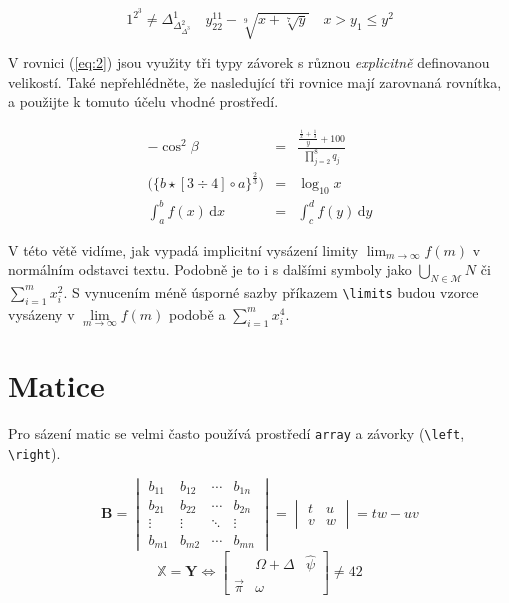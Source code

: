 \documentclass[hidelinks, twocolumn, a4paper, 11pt]{article}
\theoremstyle{definition}
\begin{document}
\[ 
1^{2^3} \neq \Delta_{\Delta_{\Delta^3}^2}^1 \quad
y^{11}_{22} - \sqrt[9]{x+\sqrt[7]{y}} \quad 
x > y_1 \leq y^2    
\]

V rovnici (\ref{eq:2}) jsou využity tři typy závorek s různou \textsl{explicitně} definovanou velikostí. 
Také nepřehlédněte, že nasledující tři rovnice mají zarovnaná rovnítka, 
a použijte k tomuto účelu vhodné prostředí. 


\begin{eqnarray}
    -\cos^2\beta & = & \frac{\frac{\frac{1}{x} + \frac{1}{3}}{y} + 100}{\prod\limits_{j=2}^8 q_j} \\
    \Biggl( \biggl\{ b \star [3 \div 4] \circ  a \biggl\}^{\frac{2}{3}} \Biggl) & = & \log_{10} x \label{eq:2}\\
    \int_a^b f(x)\,\mathrm{d}x & = & \int_c^d f(y)\,\mathrm{d}y 
\end{eqnarray}


V této větě vidíme, jak vypadá implicitní vysázení limity $\lim_{m \to \infty} f(m)$ v normálním odstavci textu. 
Podobně je to i s dalšími symboly jako $ \bigcup_{N \in \mathcal{M}} N$ či $\sum_{i=1}^{m} x_i^2$. 
S vynucením méně úsporné sazby příkazem \verb|\limits| budou vzorce vysázeny v $ \lim\limits_{m \to \infty} f(m)$ podobě a $ \sum\limits_{i=1}^m x_i^4 $.


\section{Matice}

Pro sázení matic se velmi často používá prostředí \verb|array| a závorky (\verb|\left|, \verb|\right|). 

\[
    \mathbf{B} = 
    \begin{vmatrix}
        b_{11} & b_{12} & \cdots & b_{1n} \\
        b_{21} & b_{22} & \cdots & b_{2n} \\
        \vdots & \vdots & \ddots & \vdots \\ 
        b_{m1} & b_{m2} & \cdots & b_{mn} 
    \end{vmatrix}
    =
    \begin{vmatrix}
        t & u \\
        v & w
    \end{vmatrix}
    =
    tw - uv
\]
\[
    \mathbb{X} = \mathbf{Y} \Longleftrightarrow 
    \begin{bmatrix}
        & \Omega + \Delta & \hat{\psi} \\
        \vec{\pi} & \omega & 
    \end{bmatrix}
    \neq 42
\]
\end{document}
